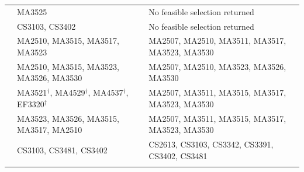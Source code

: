 \documentclass{article}
\begin{document}
{\begin{longtable}{p{1.67in}p{1.75in}p{1.75in}}
\addlinespace[2pt]
{\raggedright Year 2 CM; finance interest; Semester A candidates.\par} & {\raggedright MA3525\par} & {\raggedright No feasible selection returned\par}\\
\addlinespace[2pt]
{\raggedright Year 2 CS; AI interest; Semester A candidates.\par} & {\raggedright CS3103, CS3402\par} & {\raggedright No feasible selection returned\par}\\
\addlinespace[2pt]
{\raggedright Year 2 CM; finance GE and Analysis (MA3526) passed.\par} & {\raggedright MA2510, MA3515, MA3517, MA3523\par} & {\raggedright MA2507, MA2510, MA3511, MA3517, MA3523, MA3530\par}\\
\addlinespace[2pt]
{\raggedright Year 2 CM; finance GE passed; MA2508 not passed.\par} & {\raggedright MA2510, MA3515, MA3523, MA3526, MA3530\par} & {\raggedright MA2507, MA2510, MA3523, MA3526, MA3530\par}\\
\addlinespace[2pt]
{\raggedright Year 4 CM; finance interest; unfinished core courses.\par} & {\raggedright MA3521$^{\dagger}$, MA4529$^{\dagger}$, MA4537$^{\dagger}$, EF3320$^{\dagger}$\par} & {\raggedright MA2507, MA3511, MA3515, MA3517, MA3523, MA3530\par}\\
\addlinespace[2pt]
{\raggedright Year 2 CM; finance GE passed; explicitly prefers Enriched Mathematics.\par} & {\raggedright MA3523, MA3526, MA3515, MA3517, MA2510\par} & {\raggedright MA2507, MA3511, MA3515, MA3517, MA3523, MA3530\par}\\
\addlinespace[2pt]
{\raggedright Year 2 CS; AI GE passed; explicitly prefers Data Science.\par} & {\raggedright CS3103, CS3481, CS3402\par} & {\raggedright CS2613, CS3103, CS3342, CS3391, CS3402, CS3481\par}\\
\addlinespace[2pt]

\end{longtable}}
\end{document}
